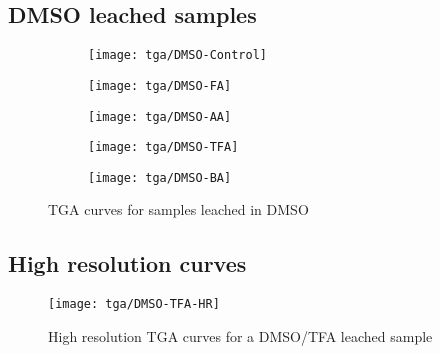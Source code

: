 \subsection{\gls{DMSO} leached samples}
\begin{figure}[H]
    \centering

    \begin{subfigure}{0.46\linewidth}
        \texttt{[image: tga/DMSO-Control]}%
        \label{appx:def:fig:tga-dmso-cont}
    \end{subfigure}%

    \begin{subfigure}{0.46\linewidth}
        \texttt{[image: tga/DMSO-FA]}%
        \label{appx:def:fig:tga-dmso-fa}
    \end{subfigure}%
    \begin{subfigure}{0.46\linewidth}
        \texttt{[image: tga/DMSO-AA]}%
        \label{appx:def:fig:tga-dmso-aa}
    \end{subfigure}%

    \begin{subfigure}{0.46\linewidth}
        \texttt{[image: tga/DMSO-TFA]}%
        \label{appx:def:fig:tga-dmso-tfa}
    \end{subfigure}%
    \begin{subfigure}{0.46\linewidth}
        \texttt{[image: tga/DMSO-BA]}%
        \label{appx:def:fig:tga-dmso-ba}
    \end{subfigure}%

    \caption{\gls{TGA} curves for samples leached in \gls{DMSO}}%
\end{figure}

\subsection{High resolution curves}

\begin{figure}[H]

    \centering

    \texttt{[image: tga/DMSO-TFA-HR]}%
    \caption{High resolution \gls{TGA} curves for a \gls{DMSO}/\gls{TFA} leached sample}%
    \label{appx:def:fig:tga-dmso-tfa-hr}
\end{figure}
